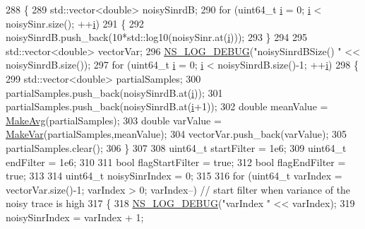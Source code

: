 \begin{DoxyCode}
288 \{
289         std::vector<double> noisySinrdB;
290         \textcolor{keywordflow}{for} (uint64\_t \hyperlink{bernuolliDistribution_8m_a6f6ccfcf58b31cb6412107d9d5281426}{i} = 0; \hyperlink{bernuolliDistribution_8m_a6f6ccfcf58b31cb6412107d9d5281426}{i} < noisySinr.size(); ++\hyperlink{bernuolliDistribution_8m_a6f6ccfcf58b31cb6412107d9d5281426}{i})
291         \{
292                 noisySinrdB.push\_back(10*std::log10(noisySinr.at(\hyperlink{bernuolliDistribution_8m_a6f6ccfcf58b31cb6412107d9d5281426}{i})));
293         \}       
294 
295         std::vector<double> vectorVar;
296         \hyperlink{group__logging_ga413f1886406d49f59a6a0a89b77b4d0a}{NS\_LOG\_DEBUG}(\textcolor{stringliteral}{"noisySinrdBSize() "} << noisySinrdB.size());
297         \textcolor{keywordflow}{for} (uint64\_t \hyperlink{bernuolliDistribution_8m_a6f6ccfcf58b31cb6412107d9d5281426}{i} = 0; \hyperlink{bernuolliDistribution_8m_a6f6ccfcf58b31cb6412107d9d5281426}{i} < noisySinrdB.size()-1; ++\hyperlink{bernuolliDistribution_8m_a6f6ccfcf58b31cb6412107d9d5281426}{i})
298         \{       
299                 std::vector<double> partialSamples;
300                 partialSamples.push\_back(noisySinrdB.at(\hyperlink{bernuolliDistribution_8m_a6f6ccfcf58b31cb6412107d9d5281426}{i}));
301                 partialSamples.push\_back(noisySinrdB.at(\hyperlink{bernuolliDistribution_8m_a6f6ccfcf58b31cb6412107d9d5281426}{i}+1));
302                 \textcolor{keywordtype}{double} meanValue = \hyperlink{classns3_1_1MmWaveEnbPhy_ac8702bd18540548b2b3c22e6f321f2d4}{MakeAvg}(partialSamples);
303                 \textcolor{keywordtype}{double} varValue = \hyperlink{classns3_1_1MmWaveEnbPhy_ad8b13e8ca6de657b7a6ad79a7d2831d1}{MakeVar}(partialSamples,meanValue);
304                 vectorVar.push\_back(varValue);
305                 partialSamples.clear();
306         \}
307 
308         uint64\_t startFilter = 1e6;
309         uint64\_t endFilter = 1e6;
310 
311         \textcolor{keywordtype}{bool} flagStartFilter = \textcolor{keyword}{true};
312         \textcolor{keywordtype}{bool} flagEndFilter = \textcolor{keyword}{true};
313 
314         uint64\_t noisySinrIndex = 0;
315 
316         \textcolor{keywordflow}{for} (uint64\_t varIndex = vectorVar.size()-1; varIndex > 0; varIndex--) \textcolor{comment}{// start filter when
       variance of the noisy trace is high}
317         \{
318                 \hyperlink{group__logging_ga413f1886406d49f59a6a0a89b77b4d0a}{NS\_LOG\_DEBUG}(\textcolor{stringliteral}{"varIndex "} << varIndex);
319                 noisySinrIndex = varIndex + 1;

\end{DoxyCode}
